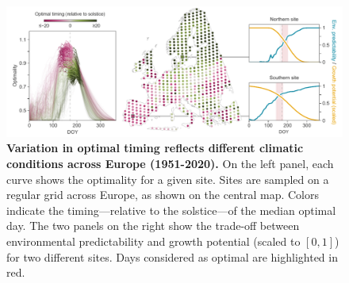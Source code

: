 \documentclass[11pt,letter]{article}
\begin{document}
\begin{figure}[h]
\hspace*{-1.2cm}
\includegraphics{local_optimality_alt.pdf}
\vspace*{-0.9cm}
\caption{\textbf{Variation in optimal timing reflects different climatic conditions across Europe (1951-2020).} On the left panel, each curve shows the optimality for a given site. Sites are sampled on a regular grid across Europe, as shown on the central map. Colors indicate the timing---relative to the solstice---of the median optimal day. The two panels on the right show the trade-off between environmental predictability and growth potential (scaled to $[0,1]$) for two different sites. Days considered as optimal are highlighted in red.}
\label{fig:localoptimality}
\end{figure}

\clearpage


\end{document}
